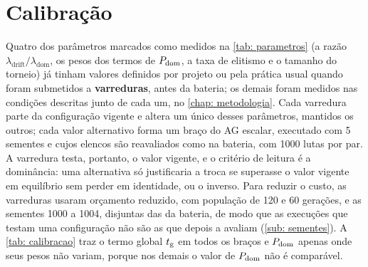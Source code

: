 \section{Calibração}
\label{sec: calibracao}

Quatro dos parâmetros marcados como medidos na \autoref{tab: parametros} (a razão $\lambda_{\mathrm{drift}}/\lambda_{\mathrm{dom}}$, os pesos dos termos de $P_{\mathrm{dom}}$, a taxa de elitismo e o tamanho do torneio) já tinham valores definidos por projeto ou pela prática usual quando foram submetidos a \textbf{varreduras}, antes da bateria; os demais foram medidos nas condições descritas junto de cada um, no \autoref{chap: metodologia}. Cada varredura parte da configuração vigente e altera um único desses parâmetros, mantidos os outros; cada valor alternativo forma um braço do AG escalar, executado com 5 sementes e cujos elencos são reavaliados como na bateria, com 1000 lutas por par. A varredura testa, portanto, o valor vigente, e o critério de leitura é a dominância: uma alternativa só justificaria a troca se superasse o valor vigente em equilíbrio sem perder em identidade, ou o inverso. Para reduzir o custo, as varreduras usaram orçamento reduzido, com população de 120 e 60 gerações, e as sementes 1000 a 1004, disjuntas das da bateria, de modo que as execuções que testam uma configuração não são as que depois a avaliam (\autoref{sub: sementes}). A \autoref{tab: calibracao} traz o termo global $t_{\mathrm{g}}$ em todos os braços e $P_{\mathrm{dom}}$ apenas onde seus pesos não variam, porque nos demais o valor de $P_{\mathrm{dom}}$ não é comparável.

